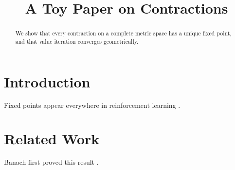 \documentclass{article}
\title{A Toy Paper on Contractions}
\begin{document}
\maketitle
\begin{abstract}
We show that every contraction on a complete metric space has a unique fixed point, and that value iteration
converges geometrically.
\end{abstract}
\section{Introduction}
Fixed points appear everywhere in reinforcement learning \cite{bellman1957,sutton2018}. %
\section{Related Work}
Banach first proved this result \citep{banach1922}.



\end{document}

